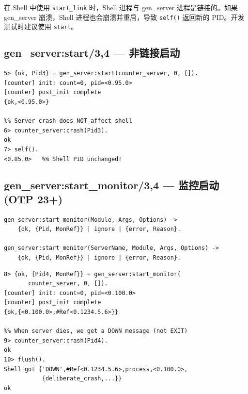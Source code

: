 \documentclass[a4paper,11pt]{article}
\begin{document}
\begin{warnbox}
在 Shell 中使用 \texttt{start\_link} 时，Shell 进程与 gen\_server 进程是链接的。如果 gen\_server 崩溃，Shell 进程也会崩溃并重启，导致 \texttt{self()} 返回新的 PID。开发测试时建议使用 \texttt{start}。
\end{warnbox}

\subsection{gen\_server:start/3,4 --- 非链接启动}

\begin{lstlisting}[style=shellstyle, caption={start 交互演示}]
%% No link - server and caller are independent
5> {ok, Pid3} = gen_server:start(counter_server, 0, []).
[counter] init: count=0, pid=<0.95.0>
[counter] post_init complete
{ok,<0.95.0>}

%% Server crash does NOT affect shell
6> counter_server:crash(Pid3).
ok
7> self().
<0.85.0>   %% Shell PID unchanged!
\end{lstlisting}

\subsection{gen\_server:start\_monitor/3,4 --- 监控启动 (OTP 23+)}

\begin{lstlisting}[style=erlangstyle, caption={start\_monitor 函数签名}]
gen_server:start_monitor(Module, Args, Options) ->
    {ok, {Pid, MonRef}} | ignore | {error, Reason}.

gen_server:start_monitor(ServerName, Module, Args, Options) ->
    {ok, {Pid, MonRef}} | ignore | {error, Reason}.
\end{lstlisting}

\begin{lstlisting}[style=shellstyle, caption={start\_monitor 交互演示}]
8> {ok, {Pid4, MonRef}} = gen_server:start_monitor(
       counter_server, 0, []).
[counter] init: count=0, pid=<0.100.0>
[counter] post_init complete
{ok,{<0.100.0>,#Ref<0.1234.5.6>}}

%% When server dies, we get a DOWN message (not EXIT)
9> counter_server:crash(Pid4).
ok
10> flush().
Shell got {'DOWN',#Ref<0.1234.5.6>,process,<0.100.0>,
           {deliberate_crash,...}}
ok
\end{lstlisting}
\end{document}
